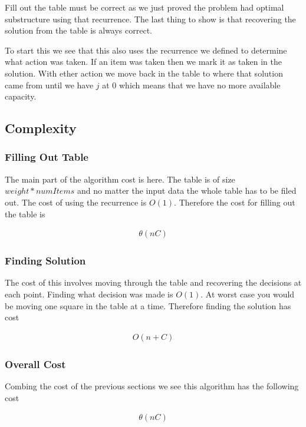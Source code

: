 \documentclass{article}
\begin{document}
		Fill out the table must be correct as we just proved the problem had optimal substructure using that recurrence. The last thing to show is that recovering the solution from the table is always correct.\newline
		
		To start this we see that this also uses the recurrence we defined to determine what action was taken. If an item was taken then we mark it as taken in the solution. With ether action we move back in the table to where that solution came from until we have $j$ at 0 which means that we have no more available capacity.		
		
		\subsection{Complexity}		
			\subsubsection{Filling Out Table}
				The main part of the algorithm cost is here. The table is of size $weight * numItems$ and no matter the input data the whole table has to be filed out. The cost of using the recurrence is $O(1)$. Therefore the cost for filling out the table is
		
				\begin{align}
					\theta(nC)
				\end{align}
				
			\subsubsection{Finding Solution}
				The cost of this involves moving through the table and recovering the decisions at each point. Finding what decision was made is $O(1)$. At worst case you would be moving one square in the table at a time. Therefore finding the solution has cost
				
				\begin{align}
					O(n + C)
				\end{align}
				
			\subsubsection{Overall Cost}
				Combing the cost of the previous sections we see this algorithm has the following cost
				
				\begin{align}
					\theta(nC)
				\end{align}
		
\end{document}
